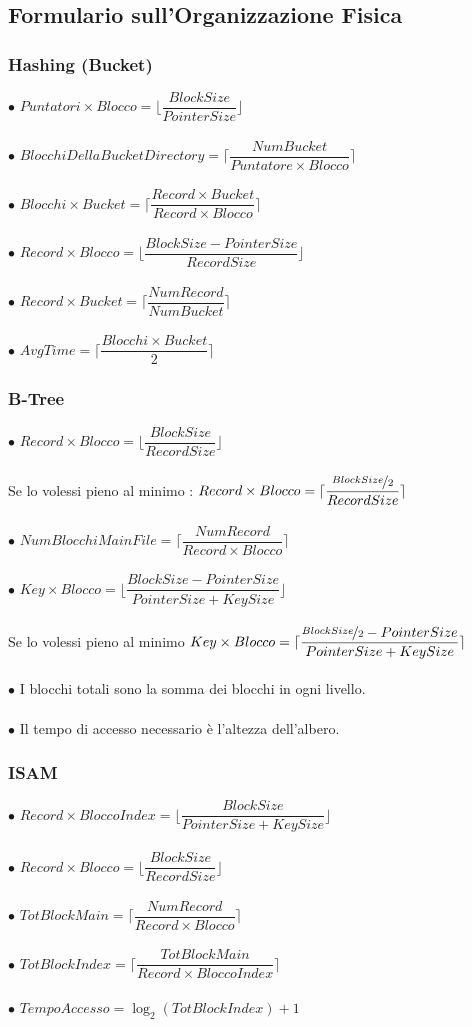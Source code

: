 \documentclass[12pt, letterpaper]{article}
\newcommand{\acc}{\\\hphantom{}\\}
\newcommand{\fdot}{{\(\bullet\) }}
\begin{document}
\subsection{Formulario sull'Organizzazione Fisica}
\subsubsection{Hashing (Bucket)}
\fdot \(Puntatori\times Blocco = \lfloor\dfrac{BlockSize}{PointerSize}\rfloor\)\acc
\fdot \(BlocchiDellaBucketDirectory = \lceil \dfrac{NumBucket}{Puntatore\times Blocco}\rceil\)\acc 
\fdot \(Blocchi\times Bucket=\lceil\dfrac{Record \times Bucket}{Record\times Blocco}\rceil\)\acc 
\fdot \(Record\times Blocco = \lfloor\dfrac{BlockSize-PointerSize}{RecordSize}\rfloor\)\acc 
\fdot \(Record \times Bucket=\lceil\dfrac{NumRecord}{NumBucket}\rceil\)\acc 
\fdot \(AvgTime=\lceil\dfrac{Blocchi\times Bucket}{2}\rceil\)
\subsubsection{B-Tree}
\fdot \(Record\times Blocco=\lfloor\dfrac{BlockSize}{RecordSize}\rfloor\) \acc 
Se lo volessi pieno al minimo : \(Record\times Blocco=\lceil\dfrac{\nicefrac{BlockSize}{2}}{RecordSize}\rceil\)\acc 
\fdot \(NumBlocchiMainFile=\lceil\dfrac{NumRecord}{Record\times Blocco}\rceil\)\acc 
\fdot \(Key\times Blocco = \lfloor\dfrac{BlockSize-PointerSize}{PointerSize+KeySize}\rfloor\)\acc 
Se lo volessi pieno al minimo  \(Key\times Blocco = \lceil\dfrac{\nicefrac{BlockSize}{2}-PointerSize}{PointerSize+KeySize}\rceil\)\acc 
\fdot I blocchi totali sono la somma dei blocchi in ogni livello. \acc 
\fdot Il tempo di accesso necessario è l'altezza dell'albero.
\subsubsection{ISAM}
\fdot \(Record\times BloccoIndex = \lfloor\dfrac{BlockSize}{PointerSize+KeySize}\rfloor\)\acc 
\fdot \(Record\times Blocco=\lfloor\dfrac{BlockSize}{RecordSize}\rfloor\)\acc 
\fdot \(TotBlockMain=\lceil\dfrac{NumRecord}{Record\times Blocco}\rceil\)\acc
\fdot \(TotBlockIndex=\lceil\dfrac{TotBlockMain}{Record\times BloccoIndex}\rceil\)\acc 
\fdot  \(TempoAccesso=\log_2(TotBlockIndex)+1\)
\end{document}
